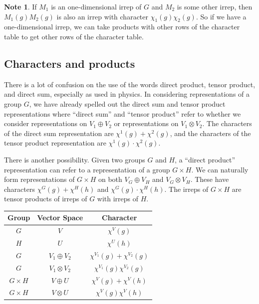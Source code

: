 \documentclass[12pt, letterpaper]{article}
\theoremstyle{definition} %
\newtheorem{note}[thm]{Note}
\begin{document}
\begin{note}
  If $M_1$ is an one-dimensional irrep of $G$ and $M_2$ is some other irrep, 
  then $M_1(g)M_2(g)$ is also an irrep with character $\chi_1(g) \chi_2(g)$. 
  So if we have a one-dimensional irrep, we can take products with other rows
  of the character table to get other rows of the character table.
\end{note}

\subsection{Characters and products}

There is a lot of confusion on the use of the words direct product, tensor product, and direct sum, especially as used in physics.
In considering representations of a group $G$, we have already spelled out the direct sum and tensor product representations where ``direct sum'' and ``tensor product'' refer to whether we 
consider representations on $V_1\oplus V_2$ or representations on $V_1\otimes V_2$. The characters of the direct sum representation are $\chi^1(g)+\chi^2(g)$, and the characters of the 
tensor product representation are $\chi^1(g)\cdot \chi^2(g)$. 

There is another possibility. 
Given two groups $G$ and $H$, a ``direct product'' representation can refer to a representation of a group $G\times H$. We can naturally form representations of $G\times H$ 
on both $V_G\oplus V_H$ and $V_G\otimes V_H$. These have characters $\chi^G(g)+\chi^H(h)$ and $\chi^G(g)\cdot \chi^H(h)$. The
irreps of $G\times H$ are tensor products of irreps of $G$ with irreps of $H$.

\begin{center}
  \begin{tabular}{|c | c | c|}
    \hline
  Group & Vector Space & Character \\
  \hline
  $G$ & $V$ & $\chi^V(g)$  \\
  $H$ & $U$ & $\chi^U(h)$  \\
  $G$ & $V_1\oplus V_2$ & $\chi^{V_1}(g)+\chi^{V_2}(g)$  \\
  $G$ & $V_1\otimes V_2$ & $\chi^{V_1}(g)\chi^{V_2}(g)$  \\
  $G\times H$ & $V\oplus U$ & $\chi^{V}(g)+\chi^{V}(h)$  \\
  $G\times H$ & $V\otimes U$ & $\chi^{V}(g)\chi^{V}(h)$ \\
 \hline
\end{tabular}
\end{center}
\end{document}
